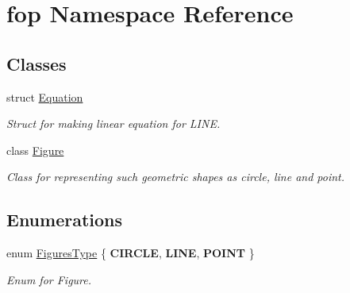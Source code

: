 \hypertarget{namespacefop}{}\section{fop Namespace Reference}
\label{namespacefop}
\subsection*{Classes}
\begin{DoxyCompactItemize}
\item 
struct \mbox{\hyperlink{structfop_1_1_equation}{Equation}}
\begin{DoxyCompactList}\small\item\em Struct for making linear equation for L\+I\+NE. \end{DoxyCompactList}\item 
class \mbox{\hyperlink{classfop_1_1_figure}{Figure}}
\begin{DoxyCompactList}\small\item\em Class for representing such geometric shapes as circle, line and point. \end{DoxyCompactList}\end{DoxyCompactItemize}
\subsection*{Enumerations}
\begin{DoxyCompactItemize}
\item 
enum \mbox{\hyperlink{namespacefop_a60dafe2e1ac5bb402dad57ecacde23d5}{Figures\+Type}} \{ {\bfseries C\+I\+R\+C\+LE}, 
{\bfseries L\+I\+NE}, 
{\bfseries P\+O\+I\+NT}
 \}
\begin{DoxyCompactList}\small\item\em Enum for Figure. \end{DoxyCompactList}\end{DoxyCompactItemize}
